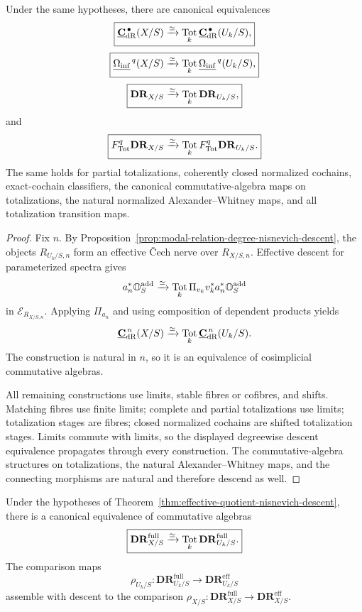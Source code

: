 \begin{theorem}
\label{thm:modal-de-rham-nisnevich-descent}
Under the same hypotheses, there are canonical equivalences
\[
\boxed{
    \underline{\mathbf C}_{\mathrm{dR}}^{\,\bullet}(X/S)
    \xrightarrow{\simeq}
    \operatorname*{Tot}_k
    \underline{\mathbf C}_{\mathrm{dR}}^{\,\bullet}(U_k/S),
}
\]
\[
\boxed{
    \underline{\Omega_{\mathrm{inf}}}^{\,q}(X/S)
    \xrightarrow{\simeq}
    \operatorname*{Tot}_k
    \underline{\Omega_{\mathrm{inf}}}^{\,q}(U_k/S),
}
\]
\[
\boxed{
    \mathbf{DR}_{X/S}
    \xrightarrow{\simeq}
    \operatorname*{Tot}_k
    \mathbf{DR}_{U_k/S},
}
\]
and
\[
\boxed{
    F_{\mathrm{Tot}}^q\mathbf{DR}_{X/S}
    \xrightarrow{\simeq}
    \operatorname*{Tot}_k
    F_{\mathrm{Tot}}^q\mathbf{DR}_{U_k/S}.
}
\]
The same holds for partial totalizations, coherently closed normalized cochains, exact-cochain classifiers, the
canonical commutative-algebra maps on totalizations, the natural normalized Alexander--Whitney maps,
and all totalization transition maps.
\end{theorem}

\begin{proof}
Fix \(n\).  By Proposition~\ref{prop:modal-relation-degree-nisnevich-descent}, the objects
\(R_{U_k/S,n}\) form an effective \v{C}ech nerve over \(R_{X/S,n}\).  Effective descent for
parameterized spectra gives
\[
    a_n^*\mathbb O_S^{\mathrm{add}}
    \xrightarrow{\simeq}
    \operatorname*{Tot}_k\Pi_{v_k}v_k^*a_n^*\mathbb O_S^{\mathrm{add}}
\]
in \(\mathcal E_{R_{X/S,n}}\).  Applying \(\Pi_{a_n}\) and using composition of dependent products yields
\[
    \underline{\mathbf C}_{\mathrm{dR}}^{\,n}(X/S)
    \xrightarrow{\simeq}
    \operatorname*{Tot}_k
    \underline{\mathbf C}_{\mathrm{dR}}^{\,n}(U_k/S).
\]
The construction is natural in \(n\), so it is an equivalence of cosimplicial commutative algebras.

All remaining constructions use limits, stable fibres or cofibres, and shifts.  Matching fibres use
finite limits; complete and partial totalizations use limits; totalization stages are fibres; closed normalized cochains
are shifted totalization stages.  Limits commute with limits, so the displayed degreewise descent
equivalence propagates through every construction.  The commutative-algebra structures on
totalizations, the natural Alexander--Whitney maps, and the connecting morphisms are natural and
therefore descend as well.
\end{proof}

\begin{theorem}
\label{thm:full-dr-nisnevich-descent}
Under the hypotheses of Theorem~\ref{thm:effective-quotient-nisnevich-descent}, there is a canonical
equivalence of commutative algebras
\[
\boxed{
    \mathbf{DR}^{\mathrm{full}}_{X/S}
    \xrightarrow{\simeq}
    \operatorname*{Tot}_k
    \mathbf{DR}^{\mathrm{full}}_{U_k/S}.
}
\]
The comparison maps
\[
    \rho_{U_k/S}:
    \mathbf{DR}^{\mathrm{full}}_{U_k/S}
    \longrightarrow
    \mathbf{DR}^{\mathrm{eff}}_{U_k/S}
\]
assemble with descent to the comparison
\(\rho_{X/S}:\mathbf{DR}^{\mathrm{full}}_{X/S}\to\mathbf{DR}^{\mathrm{eff}}_{X/S}\).
\end{theorem}

